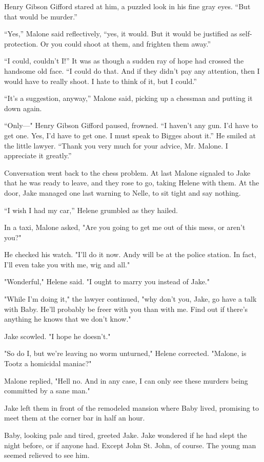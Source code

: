 \documentclass{novel}
\begin{document}
Henry Gibson Gifford stared at him, a puzzled look in his fine gray eyes. “But that would be murder.”

“Yes,” Malone said reflectively, “yes, it would. But it would be justified as self-protection. Or you could shoot at them, and frighten them away.”

“I could, couldn’t I!” It was as though a sudden ray of hope had crossed the handsome old face. “I could do that. And if they didn’t pay any attention, then I would have to really shoot. I hate to think of it, but I could.”

“It’s a suggestion, anyway,” Malone said, picking up a chessman and putting it down again.

“Only—" Henry Gibson Gifford paused, frowned. “I haven’t any gun. I’d have to get one. Yes, I’d have to get one. I must speak to Bigges about it.” He smiled at the little lawyer. “Thank you very much for your advice, Mr. Malone. I appreciate it greatly.”

Conversation went back to the chess problem. At last Malone signaled to Jake that he was ready to leave, and they rose to go, taking Helene with them. At the door, Jake managed one last warning to Nelle, to sit tight and say nothing.

“I wish I had my car,” Helene grumbled as they hailed.

In a taxi, Malone asked, "Are you going to get me out of this mess, or aren't you?"

He checked his watch. "I'll do it now. Andy will be at the police station. In fact, I'll even take you with me, wig and all."

"Wonderful," Helene said. "I ought to marry you instead of Jake."

"While I'm doing it," the lawyer continued, "why don't you, Jake, go have a talk with Baby. He'll probably be freer with you than with me. Find out if there's anything he knows that we don't know."

Jake scowled. "I hope he doesn't."

"So do I, but we're leaving no worm unturned," Helene corrected. "Malone, is Tootz a homicidal maniac?"

Malone replied, "Hell no. And in any case, I can only see these murders being committed by a sane man."

Jake left them in front of the remodeled mansion where Baby lived, promising to meet them at the corner bar in half an hour.

Baby, looking pale and tired, greeted Jake. Jake wondered if he had slept the night before, or if anyone had. Except John St. John, of course. The young man seemed relieved to see him.
\end{document}
